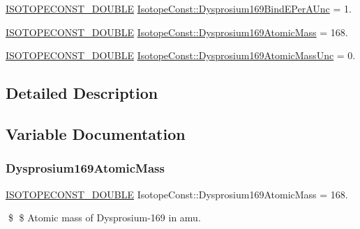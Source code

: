 \begin{DoxyCompactItemize}
\item 
\mbox{\hyperlink{group___isotope_const-_macros_ga8f45a7272ce02c0b4c65c44636ed719a}{I\+S\+O\+T\+O\+P\+E\+C\+O\+N\+S\+T\+\_\+\+D\+O\+U\+B\+LE}} \mbox{\hyperlink{group___isotope_const-_dysprosium-_dy169_gad651f2b7f1702f4fc7b065325125ebab}{Isotope\+Const\+::\+Dysprosium169\+Bind\+E\+Per\+A\+Unc}} = 1.
\item 
\mbox{\hyperlink{group___isotope_const-_macros_ga8f45a7272ce02c0b4c65c44636ed719a}{I\+S\+O\+T\+O\+P\+E\+C\+O\+N\+S\+T\+\_\+\+D\+O\+U\+B\+LE}} \mbox{\hyperlink{group___isotope_const-_dysprosium-_dy169_gae683628279a4a73d5e1f18310832d6ff}{Isotope\+Const\+::\+Dysprosium169\+Atomic\+Mass}} = 168.
\item 
\mbox{\hyperlink{group___isotope_const-_macros_ga8f45a7272ce02c0b4c65c44636ed719a}{I\+S\+O\+T\+O\+P\+E\+C\+O\+N\+S\+T\+\_\+\+D\+O\+U\+B\+LE}} \mbox{\hyperlink{group___isotope_const-_dysprosium-_dy169_ga1ffca548b9ff4b4cbf41b9880dce4bd7}{Isotope\+Const\+::\+Dysprosium169\+Atomic\+Mass\+Unc}} = 0.
\end{DoxyCompactItemize}


\subsection{Detailed Description}


\subsection{Variable Documentation}
\mbox{\label{group___isotope_const-_dysprosium-_dy169_gae683628279a4a73d5e1f18310832d6ff}} 
\subsubsection{\texorpdfstring{Dysprosium169\+Atomic\+Mass}{Dysprosium169AtomicMass}}
{\footnotesize\ttfamily \mbox{\hyperlink{group___isotope_const-_macros_ga8f45a7272ce02c0b4c65c44636ed719a}{I\+S\+O\+T\+O\+P\+E\+C\+O\+N\+S\+T\+\_\+\+D\+O\+U\+B\+LE}} Isotope\+Const\+::\+Dysprosium169\+Atomic\+Mass = 168.}

\$ \$ Atomic mass of Dysprosium-\/169 in amu. \mbox{\label{group___isotope_const-_dysprosium-_dy169_ga1ffca548b9ff4b4cbf41b9880dce4bd7}} 
